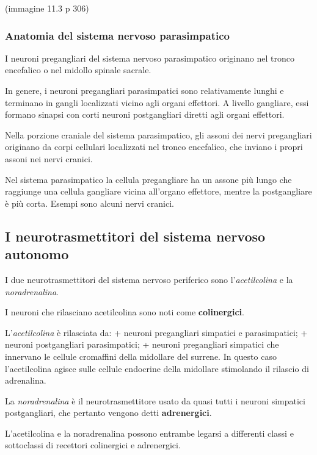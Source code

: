 \documentclass[]{article}
\begin{document}
(immagine 11.3 p 306)

\subsubsection{Anatomia del sistema nervoso
parasimpatico}\label{anatomia-del-sistema-nervoso-parasimpatico}

I neuroni pregangliari del sistema nervoso parasimpatico originano nel
tronco encefalico o nel midollo spinale sacrale.

In genere, i neuroni pregangliari parasimpatici sono relativamente
lunghi e terminano in gangli localizzati vicino agli organi effettori. A
livello gangliare, essi formano sinapsi con corti neuroni postgangliari
diretti agli organi effettori.

Nella porzione craniale del sistema parasimpatico, gli assoni dei nervi
pregangliari originano da corpi cellulari localizzati nel tronco
encefalico, che inviano i propri assoni nei nervi cranici.

Nel sistema parasimpatico la cellula pregangliare ha un assone più lungo
che raggiunge una cellula gangliare vicina all'organo effettore, mentre
la postgangliare è più corta. Esempi sono alcuni nervi cranici.

\subsection{I neurotrasmettitori del sistema nervoso
autonomo}\label{i-neurotrasmettitori-del-sistema-nervoso-autonomo}

I due neurotrasmettitori del sistema nervoso periferico sono
l'\emph{acetilcolina} e la \emph{noradrenalina}.

I neuroni che rilasciano acetilcolina sono noti come
\textbf{colinergici}.

L'\emph{acetilcolina} è rilasciata da: + neuroni pregangliari simpatici
e parasimpatici; + neuroni postgangliari parasimpatici; + neuroni
pregangliari simpatici che innervano le cellule cromaffini della
midollare del surrene. In questo caso l'acetilcolina agisce sulle
cellule endocrine della midollare stimolando il rilascio di adrenalina.

La \emph{noradrenalina} è il neurotrasmettitore usato da quasi tutti i
neuroni simpatici postgangliari, che pertanto vengono detti
\textbf{adrenergici}.

L'acetilcolina e la noradrenalina possono entrambe legarsi a differenti
classi e sottoclassi di recettori colinergici e adrenergici.
\end{document}
